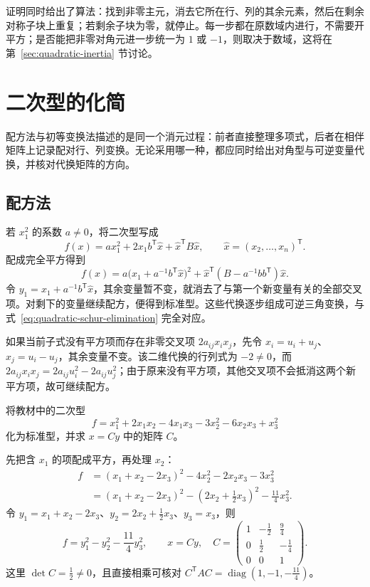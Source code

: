 证明同时给出了算法：找到非零主元，消去它所在行、列的其余元素，然后在剩余对称子块上重复；若剩余子块为零，就停止。每一步都在原数域内进行，不需要开平方；是否能把非零对角元进一步统一为 $1$ 或 $-1$，则取决于数域，这将在第~\ref{sec:quadratic-inertia} 节讨论。

\section{二次型的化简}
\label{sec:quadratic-reduction}

配方法与初等变换法描述的是同一个消元过程：前者直接整理多项式，后者在相伴矩阵上记录配对行、列变换。无论采用哪一种，都应同时给出对角型与可逆变量代换，并核对代换矩阵的方向。

\subsection{配方法}

若 $x_1^2$ 的系数 $a\ne0$，将二次型写成
\[
    f(x)=ax_1^2+2x_1b^{\mathsf T}\widehat x
          +\widehat x^{\mathsf T}B\widehat x,
    \qquad \widehat x=(x_2,\ldots,x_n)^{\mathsf T}.
\]
配成完全平方得到
\begin{equation}
\label{eq:quadratic-completing-square}
    f(x)=a\bigl(x_1+a^{-1}b^{\mathsf T}\widehat x\bigr)^2
          +\widehat x^{\mathsf T}(B-a^{-1}bb^{\mathsf T})\widehat x.
\end{equation}
令 $y_1=x_1+a^{-1}b^{\mathsf T}\widehat x$，其余变量暂不变，就消去了与第一个新变量有关的全部交叉项。对剩下的变量继续配方，便得到标准型。这些代换逐步组成可逆三角变换，与式~\eqref{eq:quadratic-schur-elimination} 完全对应。

如果当前子式没有平方项而存在非零交叉项 $2a_{ij}x_ix_j$，先令 $x_i=u_i+u_j$、$x_j=u_i-u_j$，其余变量不变。该二维代换的行列式为 $-2\ne0$，而 $2a_{ij}x_ix_j=2a_{ij}u_i^2-2a_{ij}u_j^2$；由于原来没有平方项，其他交叉项不会抵消这两个新平方项，故可继续配方。

\begin{example}
\label{ex:quadratic-completing-square}
将教材中的二次型
\[
    f=x_1^2+2x_1x_2-4x_1x_3-3x_2^2-6x_2x_3+x_3^2
\]
化为标准型，并求 $x=Cy$ 中的矩阵 $C$。
\end{example}
\begin{solve}
先把含 $x_1$ 的项配成平方，再处理 $x_2$：
\[
\begin{aligned}
    f&=(x_1+x_2-2x_3)^2-4x_2^2-2x_2x_3-3x_3^2\\
     &=(x_1+x_2-2x_3)^2
       -\left(2x_2+\frac12x_3\right)^2-\frac{11}{4}x_3^2.
\end{aligned}
\]
令 $y_1=x_1+x_2-2x_3$、$y_2=2x_2+\frac12x_3$、$y_3=x_3$，则
\[
    f=y_1^2-y_2^2-\frac{11}{4}y_3^2,
    \qquad
    x=Cy,\quad
    C=\begin{pmatrix}
        1&-\frac12&\frac94\\
        0&\frac12&-\frac14\\
        0&0&1
    \end{pmatrix}.
\]
这里 $\det C=\frac12\ne0$，且直接相乘可核对 $C^{\mathsf T}AC=\operatorname{diag}(1,-1,-\frac{11}{4})$。
\end{solve}

